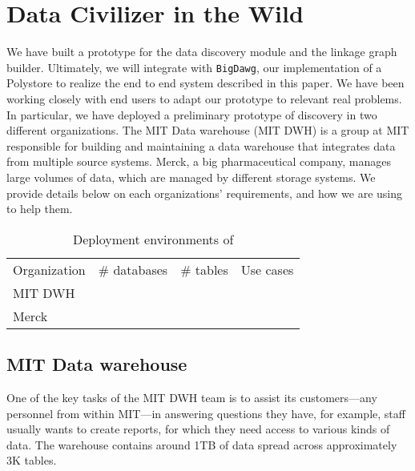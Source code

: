 \section{Data Civilizer in the Wild}
\label{sec:wild}

We have built a prototype for the data discovery module and the linkage graph builder.
Ultimately, we will integrate \dcv with \texttt{BigDawg}, our implementation of a Polystore to realize the end to end system described in this paper. 
We have been working closely with end users to adapt our prototype to relevant real problems. 
In particular, we have deployed a preliminary prototype of discovery in two different organizations. 
The MIT Data warehouse (MIT DWH) is a group at MIT responsible for building and maintaining a data warehouse that integrates data from multiple source systems. Merck, a big pharmaceutical company, manages large volumes of data, which are managed by different storage systems. 
We provide details below on each organizations' requirements, and how we are using \dcv to help them.


\begin{table}
\caption{Deployment environments of \dcv{}}\label{tab:dataCivInTheWild}
\begin{tabular}{|l|l|l|l|}
\hline
Organization & \# databases & \# tables & Use cases\\
MIT DWH & & & \\
Merck & & & \\
\hline
\end{tabular}
\end{table}


\subsection{MIT Data warehouse}


One of the key tasks of the MIT DWH team is to assist its customers—any personnel from within MIT—in answering questions they have, for example, staff usually wants to create reports, for which they need access to various kinds of data. The warehouse contains around 1TB of data spread across approximately 3K tables.

